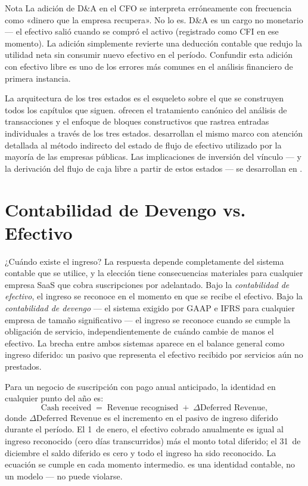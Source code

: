 \begin{admonition}{Nota}
La adición de D\&A en el CFO se interpreta erróneamente con frecuencia como «dinero que la empresa
recupera». No lo es. D\&A es un cargo no monetario --- el efectivo salió cuando se compró el activo
(registrado como CFI en ese momento). La adición simplemente revierte una deducción contable que
redujo la utilidad neta sin consumir nuevo efectivo en el período. Confundir esta adición con
efectivo libre es uno de los errores más comunes en el análisis financiero de primera instancia.
\end{admonition}

La arquitectura de los tres estados es el esqueleto sobre el que se construyen todos los capítulos
que siguen. \textcite{libby2022financial} ofrecen el tratamiento canónico del análisis de
transacciones y el enfoque de bloques constructivos que rastrea entradas individuales a través de
los tres estados. \textcite{weygandt2019financial} desarrollan el mismo marco con atención
detallada al método indirecto del estado de flujo de efectivo utilizado por la mayoría de las
empresas públicas. Las implicaciones de inversión del vínculo --- y la derivación del flujo de
caja libre a partir de estos estados --- se desarrollan en \textcite{brealey2020}.

\section{Contabilidad de Devengo vs. Efectivo}\label{sec:accrual}

¿Cuándo existe el ingreso? La respuesta depende completamente del sistema contable que se utilice,
y la elección tiene consecuencias materiales para cualquier empresa SaaS que cobra suscripciones
por adelantado. Bajo la \emph{contabilidad de efectivo}, el ingreso se reconoce en el momento en
que se recibe el efectivo. Bajo la \emph{contabilidad de devengo} --- el sistema exigido por GAAP e
IFRS para cualquier empresa de tamaño significativo --- el ingreso se reconoce cuando se cumple la
obligación de servicio, independientemente de cuándo cambie de manos el efectivo. La brecha entre
ambos sistemas aparece en el balance general como ingreso diferido: un pasivo que representa el
efectivo recibido por servicios aún no prestados.

Para un negocio de suscripción con pago anual anticipado, la identidad en cualquier punto del año
es:
\begin{equation}\label{eq:accrual-revenue}
  \text{Cash received} \;=\; \text{Revenue recognised} \;+\; \Delta\text{Deferred Revenue},
\end{equation}
donde \(\Delta\text{Deferred Revenue}\) es el incremento en el pasivo de ingreso diferido durante
el período. El 1~de enero, el efectivo cobrado anualmente es igual al ingreso reconocido (cero días
transcurridos) más el monto total diferido; el 31~de diciembre el saldo diferido es cero y todo el
ingreso ha sido reconocido. La ecuación se cumple en cada momento intermedio. 
es una identidad contable, no un modelo --- no puede violarse.

